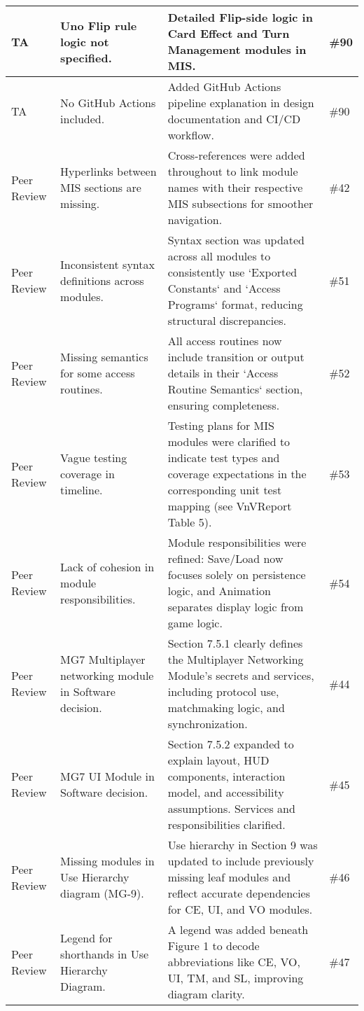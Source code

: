 \documentclass{article}
\begin{document}
\begin{longtable}{|p{2cm}|p{5cm}|p{5cm}|p{2cm}|}
\hline
TA & Uno Flip rule logic not specified. & Detailed Flip-side logic in Card Effect and Turn Management modules in MIS. & \#90 \\
\hline
TA & No GitHub Actions included. & Added GitHub Actions pipeline explanation in design documentation and CI/CD workflow. & \#90 \\
\hline
Peer Review & Hyperlinks between MIS sections are missing. & Cross-references were added throughout to link module names with their respective MIS subsections for smoother navigation. & \#42 \\
\hline
Peer Review & Inconsistent syntax definitions across modules. & Syntax section was updated across all modules to consistently use `Exported Constants` and `Access Programs` format, reducing structural discrepancies. & \#51 \\
\hline
Peer Review & Missing semantics for some access routines. & All access routines now include transition or output details in their `Access Routine Semantics` section, ensuring completeness. & \#52 \\
\hline
Peer Review & Vague testing coverage in timeline. & Testing plans for MIS modules were clarified to indicate test types and coverage expectations in the corresponding unit test mapping (see VnVReport Table 5). & \#53 \\
\hline
Peer Review & Lack of cohesion in module responsibilities. & Module responsibilities were refined: Save/Load now focuses solely on persistence logic, and Animation separates display logic from game logic. & \#54 \\
\hline
Peer Review & MG7 Multiplayer networking module in Software decision. & Section 7.5.1 clearly defines the Multiplayer Networking Module's secrets and services, including protocol use, matchmaking logic, and synchronization. & \#44 \\
\hline
Peer Review & MG7 UI Module in Software decision. & Section 7.5.2 expanded to explain layout, HUD components, interaction model, and accessibility assumptions. Services and responsibilities clarified. & \#45 \\
\hline
Peer Review & Missing modules in Use Hierarchy diagram (MG-9). & Use hierarchy in Section 9 was updated to include previously missing leaf modules and reflect accurate dependencies for CE, UI, and VO modules. & \#46 \\
\hline
Peer Review & Legend for shorthands in Use Hierarchy Diagram. & A legend was added beneath Figure 1 to decode abbreviations like CE, VO, UI, TM, and SL, improving diagram clarity. & \#47 \\

\end{longtable}
\end{document}
